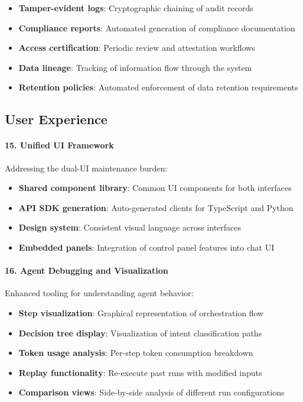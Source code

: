 \begin{itemize}
    \item \textbf{Tamper-evident logs}: Cryptographic chaining of audit records
    \item \textbf{Compliance reports}: Automated generation of compliance documentation
    \item \textbf{Access certification}: Periodic review and attestation workflows
    \item \textbf{Data lineage}: Tracking of information flow through the system
    \item \textbf{Retention policies}: Automated enforcement of data retention requirements
\end{itemize}

\subsection{User Experience}

\paragraph{15. Unified UI Framework}

Addressing the dual-UI maintenance burden:

\begin{itemize}
    \item \textbf{Shared component library}: Common UI components for both interfaces
    \item \textbf{API SDK generation}: Auto-generated clients for TypeScript and Python
    \item \textbf{Design system}: Consistent visual language across interfaces
    \item \textbf{Embedded panels}: Integration of control panel features into chat UI
\end{itemize}

\paragraph{16. Agent Debugging and Visualization}

Enhanced tooling for understanding agent behavior:

\begin{itemize}
    \item \textbf{Step visualization}: Graphical representation of orchestration flow
    \item \textbf{Decision tree display}: Visualization of intent classification paths
    \item \textbf{Token usage analysis}: Per-step token consumption breakdown
    \item \textbf{Replay functionality}: Re-execute past runs with modified inputs
    \item \textbf{Comparison views}: Side-by-side analysis of different run configurations
\end{itemize}

